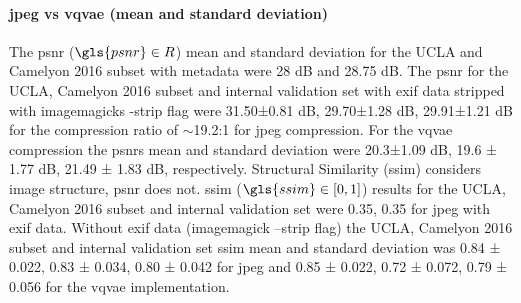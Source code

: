 \documentclass[review]{elsarticle}
\begin{document}
\paragraph{\gls{jpeg} vs \gls{vqvae} (mean and standard deviation)} The \gls{psnr} ($\gls{psnr}\in R$) mean and standard deviation for the UCLA and Camelyon 2016 subset with metadata were 28 dB and 28.75 dB. The \gls{psnr} for the UCLA, Camelyon 2016 subset and internal validation set with exif data stripped with imagemagicks -strip flag were 31.50±0.81 dB, 29.70±1.28 dB, 29.91±1.21 dB for the compression ratio of $\sim$19.2:1 for \gls{jpeg} compression. For the \gls{vqvae} compression the \gls{psnr}s mean and standard deviation were 20.3±1.09 dB, 19.6 ± 1.77 dB, 21.49 ± 1.83 dB, respectively. Structural Similarity (\gls{ssim}) considers image structure, \gls{psnr} does not. \gls{ssim} ($\gls{ssim}\in [0,1]$) results for the UCLA, Camelyon 2016 subset and internal validation set were 0.35, 0.35 for \gls{jpeg} with exif data. Without exif data (imagemagick –strip flag) the UCLA, Camelyon 2016 subset and internal validation set \gls{ssim} mean and standard deviation was 0.84 ± 0.022, 0.83 ± 0.034, 0.80 ± 0.042 for \gls{jpeg} and 0.85 ± 0.022, 0.72 ± 0.072, 0.79 ± 0.056 for the \gls{vqvae} implementation.

\end{document}
